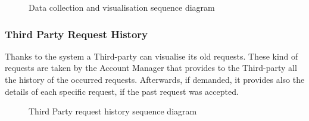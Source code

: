 \begin{figure}[H]
    \centering
    \caption{Data collection and visualisation sequence diagram}
    \label{fig:log&regDiagram}
\end{figure}

\subsubsection{Third Party Request History}
Thanks to the system a Third-party can visualise its old requests.
These kind of requests are taken by the Account Manager that provides to the Third-party all the history of the occurred requests.
Afterwards, if demanded, it provides also the details of each specific request, if the past request was accepted.

\begin{figure}[H]
    \centering
    \caption{Third Party request history sequence diagram}
    \label{fig:log&regDiagram}
\end{figure}


